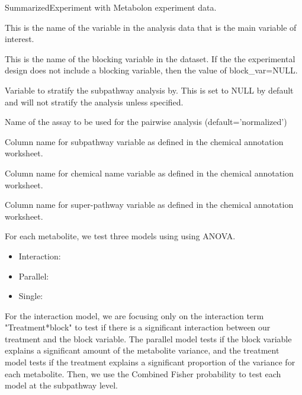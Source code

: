 \documentclass[a4paper]{book}
\begin{document}
\begin{Arguments}
\begin{ldescription}
\item[\code{data}] SummarizedExperiment with Metabolon experiment data.

\item[\code{treat\_var}] This is the name of the variable in the analysis data that is the main variable of interest.

\item[\code{block\_var}] This is the name of the blocking variable in the dataset.
If the the experimental design does not include a blocking variable, then the
value of block\_var=NULL.

\item[\code{strat\_var}] Variable to stratify the subpathway analysis by. This is set
to NULL by default and will not stratify the analysis unless specified.

\item[\code{Assay}] Name of the assay to be used for the pairwise analysis (default='normalized')

\item[\code{subPathwayName}] Column name for subpathway variable as defined in the chemical annotation worksheet.

\item[\code{chemName}] Column name for chemical name variable as defined in the chemical annotation worksheet.

\item[\code{superPathwayName}] Column name for super-pathway variable as defined in the chemical annotation worksheet.
\end{ldescription}
\end{Arguments}
%
\begin{Details}
For each metabolite, we test three models using using ANOVA.
\begin{itemize}


\item{} Interaction: 

\item{} Parallel:  

\item{} Single:  


\end{itemize}


For the interaction model, we are focusing only on the interaction term
"Treatment*block" to test if there is a significant interaction between our
treatment and the block variable. The parallel model tests if the block variable
explains a significant amount of the metabolite variance, and the treatment model
tests if the treatment explains a significant proportion of the variance for
each metabolite. Then, we use the Combined Fisher probability to test each model
at the subpathway level.

\end{Details}
\end{document}
